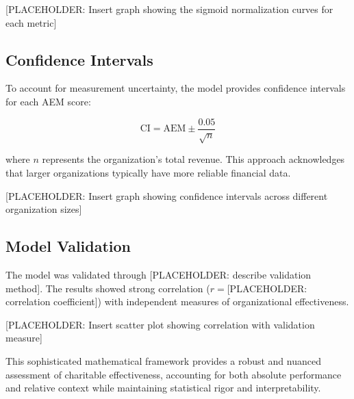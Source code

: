 \documentclass[12pt]{article}
\begin{document}
[PLACEHOLDER: Insert graph showing the sigmoid normalization curves for each metric]

\subsection{Confidence Intervals}

To account for measurement uncertainty, the model provides confidence intervals for each AEM score:

\begin{equation}
    \text{CI} = \text{AEM} \pm \frac{0.05}{\sqrt{n}}
\end{equation}

where $n$ represents the organization's total revenue. This approach acknowledges that larger organizations typically have more reliable financial data.

[PLACEHOLDER: Insert graph showing confidence intervals across different organization sizes]

\subsection{Model Validation}

The model was validated through [PLACEHOLDER: describe validation method]. The results showed strong correlation ($r = $[PLACEHOLDER: correlation coefficient]) with independent measures of organizational effectiveness.

[PLACEHOLDER: Insert scatter plot showing correlation with validation measure]

This sophisticated mathematical framework provides a robust and nuanced assessment of charitable effectiveness, accounting for both absolute performance and relative context while maintaining statistical rigor and interpretability.
\end{document}
